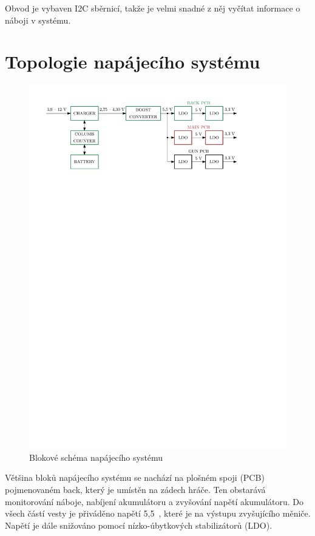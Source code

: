 Obvod je vybaven I2C sběrnicí, takže je velmi snadné z něj vyčítat informace o náboji v systému.

\section{Topologie napájecího systému}
\begin{figure}[H]
    \begin{center}
        \includegraphics[width=\textwidth]{img/power-system}
    \end{center}
    \caption{Blokové schéma napájecího systému}
\end{figure}

Většina bloků napájecího systému se nachází na plošném spoji (PCB) pojmenovaném back, který je umístěn na zádech hráče. Ten obstarává monitorování náboje, nabíjení akumulátoru a zvyšování napětí akumulátoru. Do všech částí vesty je přiváděno napětí 5,5~, které je na výstupu zvyšujícího měniče. Napětí je dále snižováno pomocí nízko-úbytkových stabilizátorů (LDO).
